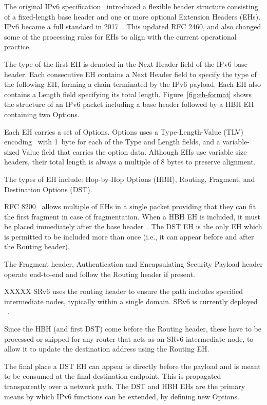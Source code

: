 \documentclass[conference]{IEEEtran}
\begin{document}
The original IPv6 specification~\cite{rfc2460} introduced a flexible header structure consisting of a
fixed-length base header and one or more optional Extension Headers (EHs). IPv6 became a full standard in 2017~\cite{RFC8200}. This updated RFC 2460, and also changed some of the processing rules for EHs to align with the current operational practice.

The type of the first EH is denoted in the Next Header field of the IPv6 base header. Each consecutive EH contains a Next Header field to specify the type of the following EH, forming a chain terminated by the IPv6 payload. Each EH also contains a Length field specifying its total length. Figure~\ref{fig:eh-format} shows the structure of an IPv6 packet including a base header followed by a HBH EH containing two Options.

Each EH carries a set of Options. Options uses a Type-Length-Value (TLV) encoding~\cite{RFC8200} with 1~byte for each of the Type and Length fields, and a variable-sized Value field that carries the option data. Although EHs use variable size headers, their total length is always a multiple of 8 bytes to preserve alignment.

The types of EH include: Hop-by-Hop Options (HBH), Routing, Fragment, and
Destination Options (DST).


RFC 8200~\cite{RFC8200} allows multiple of EHs in a single packet providing that they can fit the first fragment in case of fragmentation. When a HBH EH is included, it must be placed immediately after the base header~\cite{RFC8200}.  The DST EH is the only EH which is permitted to be included more than once (i.e., it can appear before and after the Routing header). 

The Fragment header, Authentication and Encapsulating Security Payload header operate end-to-end and follow the Routing header if present. 

XXXXX SRv6 uses the routing header to ensure the path includes specified intermediate nodes, typically within a single domain. SRv6 is currently deployed ~\cite{srv6}.

Since the HBH (and first DST) come before the Routing header, these have to be processed or skipped for any router that acts as an SRv6 intermediate node, to allow it to update the destination address using the Routing EH.

The final place a DST EH can appear is directly before the payload and is meant to be consumed at the final destination endpoint. This is propagated transparently over a network path. The DST and HBH EHs are the primary means by which IPv6 functions can be extended, by defining new Options.
\end{document}

